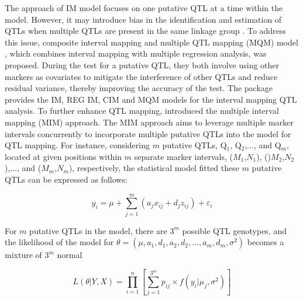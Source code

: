 The approach of IM model focuses on one putative QTL at a time within the model. However, it may introduce bias in the identification and estimation of QTLs when multiple QTLs are present in the same linkage group \citep{Lander-1989, Haley-1992, Zeng-1994}. To address this issue, composite interval mapping \citep[CIM,][]{Zeng-1994} and multiple QTL mapping (MQM) model \citep{Jansen-1993}, which combines interval mapping with multiple regression analysis, was proposed. During the test for a putative QTL, they both involve using other markers as covariates to mitigate the interference of other QTLs and reduce residual variance, thereby improving the accuracy of the test. The  package provides the IM, REG IM, CIM and MQM models for the interval mapping QTL analysis. To further enhance QTL mapping, \citet{Kao-1999} introduced the multiple interval mapping (MIM) approach. The MIM approach aims to leverage multiple marker intervals concurrently to incorporate multiple putative QTLs into the model for QTL mapping. For instance, considering $m$ putative QTLs, Q$_{1}$, Q$_{2}$,..., and Q$_{m}$, located at given positions within $m$ separate marker intervals, ($M_{1}$,$N_{1}$), ()$M_{2}$,$N_{2}$),..., and ($M_{m}$,$N_{m}$), respectively, the statistical model fitted these $m$ putative QTLs can be expressed as follows: 

\begin{equation} 
	y_{i}=\mu+\sum_{j=1}^{m}\left(a_{j}x_{ij}+d_{j}z_{ij}\right)+\varepsilon_{i} \label{eq:e4}
\end{equation} 

\noindent For $m$ putative QTLs in the model, there are $3^{m}$ possible QTL genotypes, and the likelihood of the model for $\theta=\left(\mu,a_{1},d_{1},a_{2},d_{2},...,a_{m},d_{m},\sigma^{2}\right)$ becomes a mixture of $3^{m}$ normal

\begin{equation} 
	L\left(\theta|Y,X\right)=\prod_{i=1}^{n}\left[\sum_{j=1}^{3^{m}}p_{ij}\times f\left(y_{i}|\mu_{j},\sigma^{2}\right)\right] \label{eq:e5}
\end{equation}

